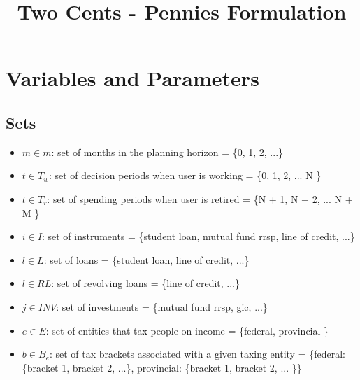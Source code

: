 \documentclass[11pt]{article}
\title{Two Cents - Pennies Formulation}
\begin{document}
\maketitle
\section{Variables and Parameters}
\subsection{Sets}
\begin{itemize}
    \item $m \in m$: set of months in the planning horizon = \{0, 1, 2, ...\}
    \item $t \in T_w$: set of decision periods when user is working = \{0, 1, 2, ... N \}
    \item $t \in T_r$: set of spending periods when user is retired = \{N + 1, N + 2, ... N + M \}
    \item $i \in I$: set of instruments = \{student loan, mutual fund rrsp, line of credit, ...\}
    \item $l \in L$: set of loans = \{student loan, line of credit, ...\}
    \item $l \in RL$: set of revolving loans = \{line of credit, ...\}
    \item $j \in INV$: set of investments = \{mutual fund rrsp, gic, ...\}
    \item $e \in E$: set of entities that tax people on income = \{federal, provincial \}
    \item $b \in B_{e}$: set of tax brackets associated with a given taxing entity = \{federal: \{bracket 1, bracket 2, ...\}, provincial: \{bracket 1, bracket 2, ... \}\}
\end{itemize}
\end{document}
